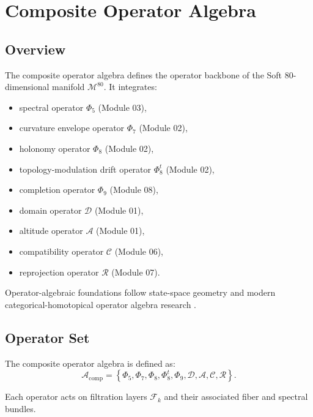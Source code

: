 
\section{Composite Operator Algebra}
\label{sec:CompositeOperatorAlgebra}

\subsection{Overview}
The composite operator algebra defines the operator backbone of the Soft
80-dimensional manifold $\mathcal{M}^{80}$. It integrates:

\begin{itemize}
    \item spectral operator $\Phi_5$ (Module 03),
    \item curvature envelope operator $\Phi_7$ (Module 02),
    \item holonomy operator $\Phi_8$ (Module 02),
    \item topology-modulation drift operator $\Phi_8^t$ (Module 02),
    \item completion operator $\Phi_9$ (Module 08),
    \item domain operator $\mathcal{D}$ (Module 01),
    \item altitude operator $\mathcal{A}$ (Module 01),
    \item compatibility operator $\mathcal{C}$ (Module 06),
    \item reprojection operator $\mathcal{R}$ (Module 07).
\end{itemize}

Operator-algebraic foundations follow state-space geometry
 and modern categorical-homotopical operator
algebra research .

\subsection{Operator Set}
The composite operator algebra is defined as:
\[
\mathcal{A}_{\mathrm{comp}}
=
\left\{
\Phi_5, \Phi_7, \Phi_8, \Phi_8^t, \Phi_9,
\mathcal{D}, \mathcal{A}, \mathcal{C}, \mathcal{R}
\right\}.
\]

Each operator acts on filtration layers $\mathcal{F}_k$ and their associated
fiber and spectral bundles.

